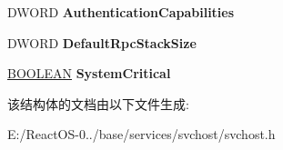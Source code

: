 \begin{DoxyCompactItemize}
\item 
\mbox{\label{struct___s_v_c_h_o_s_t___o_p_t_i_o_n_s_ac4beee38984e4c083ec0f15b0cad7e8c}} 
D\+W\+O\+RD {\bfseries Authentication\+Capabilities}
\item 
\mbox{\label{struct___s_v_c_h_o_s_t___o_p_t_i_o_n_s_a442c082cca9734e3097c9436cbea7332}} 
D\+W\+O\+RD {\bfseries Default\+Rpc\+Stack\+Size}
\item 
\mbox{\label{struct___s_v_c_h_o_s_t___o_p_t_i_o_n_s_af381353d83fe4e4045f58981584b8593}} 
\hyperlink{_processor_bind_8h_a112e3146cb38b6ee95e64d85842e380a}{B\+O\+O\+L\+E\+AN} {\bfseries System\+Critical}
\end{DoxyCompactItemize}


该结构体的文档由以下文件生成\+:\begin{DoxyCompactItemize}
\item 
E\+:/\+React\+O\+S-\/0../base/services/svchost/svchost.\+h\end{DoxyCompactItemize}
